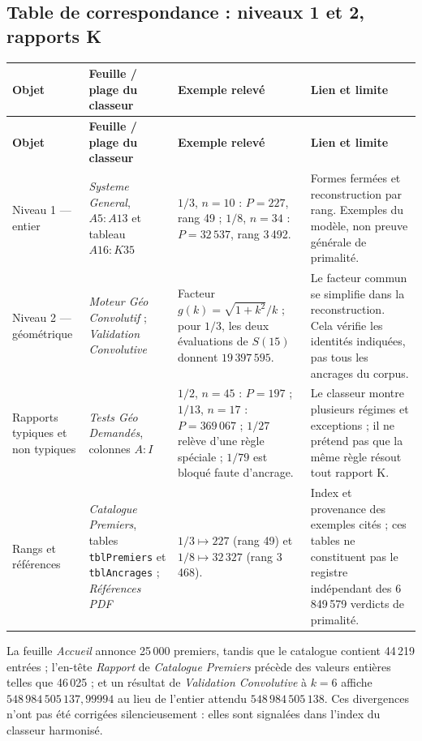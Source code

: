 \documentclass[11pt,a4paper]{article}
\begin{document}
\subsection{Table de correspondance : niveaux 1 et 2, rapports K}
\small
\begin{longtable}{@{}p{2.8cm}p{4.0cm}p{4.1cm}p{4.2cm}@{}}
\toprule
\rowcolor{spectralbleu}
\color{white}\textbf{Objet} &
\color{white}\textbf{Feuille / plage du classeur} &
\color{white}\textbf{Exemple relevé} &
\color{white}\textbf{Lien et limite} \\
\midrule
\endfirsthead
\toprule
\rowcolor{spectralbleu}
\color{white}\textbf{Objet} &
\color{white}\textbf{Feuille / plage du classeur} &
\color{white}\textbf{Exemple relevé} &
\color{white}\textbf{Lien et limite} \\
\midrule
\endhead
\bottomrule
\endfoot
\rowcolor{spectralgris}
Niveau 1 — entier &
\emph{Systeme General}, $A5:A13$ et tableau $A16:K35$ &
$1/3$, $n=10$ : $P=227$, rang 49 ; $1/8$, $n=34$ : $P=32\,537$, rang 3\,492. &
Formes fermées et reconstruction par rang. Exemples du modèle, non preuve
générale de primalité. \\
Niveau 2 — géométrique &
\emph{Moteur Géo Convolutif} ; \emph{Validation Convolutive} &
Facteur $g(k)=\sqrt{1+k^2}/k$ ; pour $1/3$, les deux évaluations de $S(15)$
donnent $19\,397\,595$. &
Le facteur commun se simplifie dans la reconstruction. Cela vérifie les
identités indiquées, pas tous les ancrages du corpus. \\
\rowcolor{spectralgris}
Rapports typiques et non typiques &
\emph{Tests Géo Demandés}, colonnes $A:I$ &
$1/2$, $n=45$ : $P=197$ ; $1/13$, $n=17$ : $P=369\,067$ ; $1/27$ relève
d'une règle spéciale ; $1/79$ est bloqué faute d'ancrage. &
Le classeur montre plusieurs régimes et exceptions ; il ne prétend pas que
la même règle résout tout rapport K. \\
Rangs et références &
\emph{Catalogue Premiers}, tables \texttt{tblPremiers} et \texttt{tblAncrages} ;
\emph{Références PDF} &
$1/3\mapsto227$ (rang 49) et $1/8\mapsto32\,327$ (rang 3\,468). &
Index et provenance des exemples cités ; ces tables ne constituent pas le
registre indépendant des 6\,849\,579 verdicts de primalité. \\
\end{longtable}
\normalsize

\begin{boitenote}
La feuille \emph{Accueil} annonce 25\,000 premiers, tandis que le catalogue
contient 44\,219 entrées ; l'en-tête \emph{Rapport} de
\emph{Catalogue Premiers} précède des valeurs entières telles que 46\,025 ;
et un résultat de \emph{Validation Convolutive} à $k=6$ affiche
$548\,984\,505\,137{,}99994$ au lieu de l'entier attendu
$548\,984\,505\,138$. Ces divergences n'ont pas été corrigées silencieusement :
elles sont signalées dans l'index du classeur harmonisé.
\end{boitenote}
\end{document}
